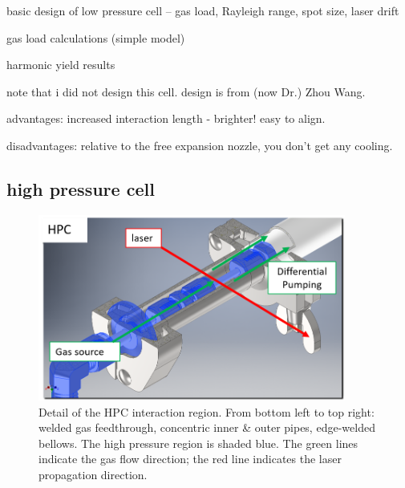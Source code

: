 basic design of low pressure cell -- gas load, Rayleigh range, spot size, laser drift

gas load calculations (simple model)

harmonic yield results

note that i did not design this cell. design is from (now Dr.) Zhou Wang.

advantages: increased interaction length - brighter! easy to align.

disadvantages: relative to the free expansion nozzle, you don't get any cooling.

\subsection{high pressure cell}

\begin{figure}
	\centering
	\includegraphics[width=0.9\textwidth]{figures/chap2/HPC_cutaway2.png}
	\caption{Detail of the HPC interaction region. From bottom left to top right: welded gas feedthrough, concentric inner \& outer pipes, edge-welded bellows. The high pressure region is shaded blue. The green lines indicate the gas flow direction; the red line indicates the laser propagation direction.}
	\label{fig:HPC_cutaway2}
\end{figure}

